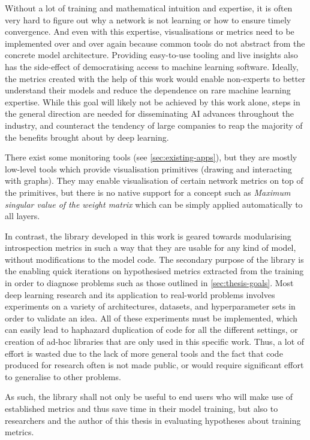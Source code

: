 Without a lot of training and mathematical intuition and expertise, it is often
very hard to figure out why a network is not learning or how to ensure timely
convergence.  And even with this expertise, visualisations or metrics need to be
implemented over and over again because common tools do not abstract from the
concrete model architecture.  Providing easy-to-use tooling and live insights
also has the side-effect of democratising access to machine learning software.
Ideally, the metrics created with the help of this work would enable non-experts
to better understand their models and reduce the dependence on rare machine
learning expertise. While this goal will likely not be achieved by this work
alone, steps in the general direction are needed for disseminating AI advances
throughout the industry, and counteract the tendency of large companies to reap
the majority of the benefits brought about by deep learning.

There exist some monitoring tools (see \cref{sec:existing-apps}), but they
are mostly low-level tools which provide visualisation primitives (drawing and
interacting with graphs). They may enable visualisation of certain network
metrics on top of the primitives, but there is no native support for a concept
such as \emph{Maximum singular value of the weight matrix} which can be simply
applied automatically to all layers.

In contrast, the library developed in this work is geared towards modularising
introspection metrics in such a way that they are usable for any kind of model,
without modifications to the model code. The secondary purpose of the library is
the enabling quick iterations on hypothesised metrics extracted from the
training in order to diagnose problems such as those outlined in
\cref{sec:thesis-goals}. Most deep learning research and its application to
real-world problems involves experiments on a variety of architectures,
datasets, and hyperparameter sets in order to validate an idea. All of these
experiments must be implemented, which can easily lead to haphazard duplication
of code for all the different settings, or creation of ad-hoc libraries that are
only used in this specific work. Thus, a lot of effort is wasted due to the lack
of more general tools and the fact that code produced for research often is not
made public, or would require significant effort to generalise to other
problems.

As such, the library shall not only be useful to end users who will make use of
established metrics and thus save time in their model training, but also to
researchers and the author of this thesis in evaluating hypotheses about
training metrics.

